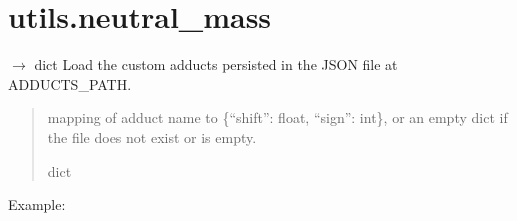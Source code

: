 \documentclass[letterpaper,10pt,english]{sphinxmanual}
\begin{document}
\section{utils.neutral\_mass}
\label{\detokenize{api:module-utils.neutral_mass}}\label{\detokenize{api:utils-neutral-mass}}

\begin{fulllineitems}
\label{\detokenize{api:utils.neutral_mass.json_adducts}}
\pysigstartsignatures
\pysiglinewithargsret
{}
{}
{{ $\rightarrow$ dict}}
\pysigstopsignatures
\sphinxAtStartPar
Load the custom adducts persisted in the JSON file at ADDUCTS\_PATH.
\begin{quote}\begin{description}
\sphinxAtStartPar
mapping of adduct name to \{“shift”: float, “sign”: int\}, or an empty
dict if the file does not exist or is empty.

\sphinxAtStartPar
dict

\end{description}\end{quote}

\sphinxAtStartPar
Example:

\begin{sphinxVerbatim}[commandchars=\\\{\}]
\end{sphinxVerbatim}

\end{fulllineitems}

\end{document}
